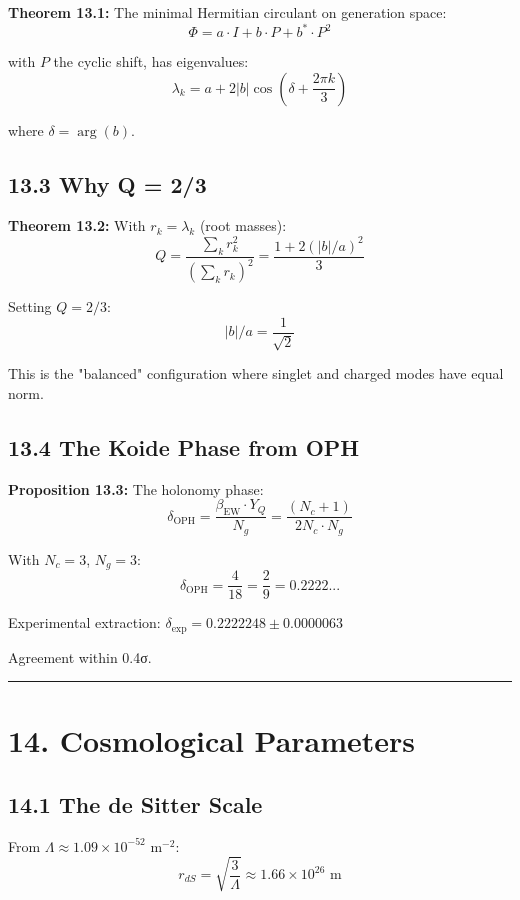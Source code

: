 \textbf{Theorem 13.1:} The minimal Hermitian circulant on generation space: \[\Phi = a \cdot I + b \cdot P + b^* \cdot P^2\]

with \(P\) the cyclic shift, has eigenvalues: \[\lambda_k = a + 2|b|\cos\left(\delta + \frac{2\pi k}{3}\right)\]

where \(\delta = \arg(b)\).

\subsection{13.3 Why Q = 2/3}\label{133-why-q--23}

\textbf{Theorem 13.2:} With \(r_k = \lambda_k\) (root masses): \[Q = \frac{\sum_k r_k^2}{(\sum_k r_k)^2} = \frac{1 + 2(|b|/a)^2}{3}\]

Setting \(Q = 2/3\): \[|b|/a = \frac{1}{\sqrt{2}}\]

This is the "balanced" configuration where singlet and charged modes have equal norm.

\subsection{13.4 The Koide Phase from OPH}\label{134-the-koide-phase-from-oph}

\textbf{Proposition 13.3:} The holonomy phase: \[\delta_{\text{OPH}} = \frac{\beta_{\text{EW}} \cdot Y_Q}{N_g} = \frac{(N_c + 1)}{2N_c \cdot N_g}\]

With \(N_c = 3\), \(N_g = 3\): \[\delta_{\text{OPH}} = \frac{4}{18} = \frac{2}{9} = 0.2222...\]

Experimental extraction: \(\delta_{\text{exp}} = 0.2222248 \pm 0.0000063\)

Agreement within 0.4σ.

\begin{center}\rule{0.5\linewidth}{0.5pt}\end{center}

\section{14. Cosmological Parameters}\label{14-cosmological-parameters}

\subsection{14.1 The de Sitter Scale}\label{141-the-de-sitter-scale}

From \(\Lambda \approx 1.09 \times 10^{-52}\) m\(^{-2}\): \[r_{dS} = \sqrt{\frac{3}{\Lambda}} \approx 1.66 \times 10^{26} \text{ m}\]

